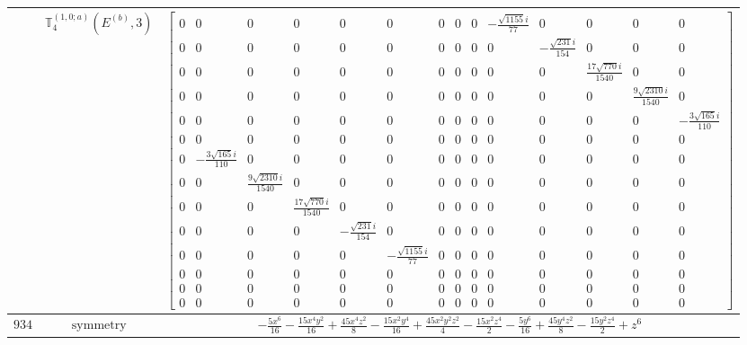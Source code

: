 \documentclass[fleqn,8pt,landscape]{jsarticle}
\begin{document}
\begin{longtable}{ccc}
$  $ & $ \mathbb{T}_{4}^{(1,0;a)}(E^{(b)},3) $ & $ \begin{bmatrix} 0 & 0 & 0 & 0 & 0 & 0 & 0 & 0 & 0 & - \frac{\sqrt{1155} i}{77} & 0 & 0 & 0 & 0 \\ 0 & 0 & 0 & 0 & 0 & 0 & 0 & 0 & 0 & 0 & - \frac{\sqrt{231} i}{154} & 0 & 0 & 0 \\ 0 & 0 & 0 & 0 & 0 & 0 & 0 & 0 & 0 & 0 & 0 & \frac{17 \sqrt{770} i}{1540} & 0 & 0 \\ 0 & 0 & 0 & 0 & 0 & 0 & 0 & 0 & 0 & 0 & 0 & 0 & \frac{9 \sqrt{2310} i}{1540} & 0 \\ 0 & 0 & 0 & 0 & 0 & 0 & 0 & 0 & 0 & 0 & 0 & 0 & 0 & - \frac{3 \sqrt{165} i}{110} \\ 0 & 0 & 0 & 0 & 0 & 0 & 0 & 0 & 0 & 0 & 0 & 0 & 0 & 0 \\ 0 & - \frac{3 \sqrt{165} i}{110} & 0 & 0 & 0 & 0 & 0 & 0 & 0 & 0 & 0 & 0 & 0 & 0 \\ 0 & 0 & \frac{9 \sqrt{2310} i}{1540} & 0 & 0 & 0 & 0 & 0 & 0 & 0 & 0 & 0 & 0 & 0 \\ 0 & 0 & 0 & \frac{17 \sqrt{770} i}{1540} & 0 & 0 & 0 & 0 & 0 & 0 & 0 & 0 & 0 & 0 \\ 0 & 0 & 0 & 0 & - \frac{\sqrt{231} i}{154} & 0 & 0 & 0 & 0 & 0 & 0 & 0 & 0 & 0 \\ 0 & 0 & 0 & 0 & 0 & - \frac{\sqrt{1155} i}{77} & 0 & 0 & 0 & 0 & 0 & 0 & 0 & 0 \\ 0 & 0 & 0 & 0 & 0 & 0 & 0 & 0 & 0 & 0 & 0 & 0 & 0 & 0 \\ 0 & 0 & 0 & 0 & 0 & 0 & 0 & 0 & 0 & 0 & 0 & 0 & 0 & 0 \\ 0 & 0 & 0 & 0 & 0 & 0 & 0 & 0 & 0 & 0 & 0 & 0 & 0 & 0 \end{bmatrix} $ \\ \hline
$ 934 $ & $ \text{symmetry} $ & $ - \frac{5 x^{6}}{16} - \frac{15 x^{4} y^{2}}{16} + \frac{45 x^{4} z^{2}}{8} - \frac{15 x^{2} y^{4}}{16} + \frac{45 x^{2} y^{2} z^{2}}{4} - \frac{15 x^{2} z^{4}}{2} - \frac{5 y^{6}}{16} + \frac{45 y^{4} z^{2}}{8} - \frac{15 y^{2} z^{4}}{2} + z^{6} $ \\

\end{longtable}
\end{document}
